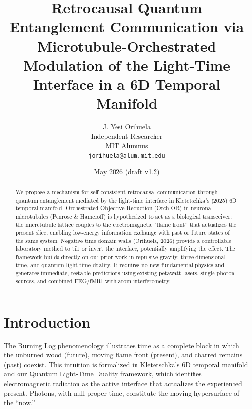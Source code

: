 \documentclass[11pt,a4paper]{article}
\begin{document}
\title{\textbf{Retrocausal Quantum Entanglement Communication via Microtubule-Orchestrated Modulation of the Light-Time Interface in a 6D Temporal Manifold}}

\author{J. Yesi Orihuela \\
\small Independent Researcher \\
\small MIT Alumnus \\
\small \texttt{jorihuela@alum.mit.edu}}

\date{May 2026 (draft v1.2)}

\maketitle

\begin{abstract}
We propose a mechanism for self-consistent retrocausal communication through quantum entanglement mediated by the light-time interface in Kletetschka’s (2025) 6D temporal manifold. Orchestrated Objective Reduction (Orch-OR) in neuronal microtubules (Penrose \& Hameroff) is hypothesized to act as a biological transceiver: the microtubule lattice couples to the electromagnetic ``flame front'' that actualizes the present slice, enabling low-energy information exchange with past or future states of the same system. Negative-time domain walls (Orihuela, 2026) provide a controllable laboratory method to tilt or invert the interface, potentially amplifying the effect. The framework builds directly on our prior work in repulsive gravity, three-dimensional time, and quantum light-time duality. It requires no new fundamental physics and generates immediate, testable predictions using existing petawatt lasers, single-photon sources, and combined EEG/fMRI with atom interferometry.
\end{abstract}

\section{Introduction}

The Burning Log phenomenology illustrates time as a complete block in which the unburned wood (future), moving flame front (present), and charred remains (past) coexist. This intuition is formalized in Kletetschka’s 6D temporal manifold and our Quantum Light-Time Duality framework, which identifies electromagnetic radiation as the active interface that actualizes the experienced present. Photons, with null proper time, constitute the moving hypersurface of the ``now.''
\end{document}
